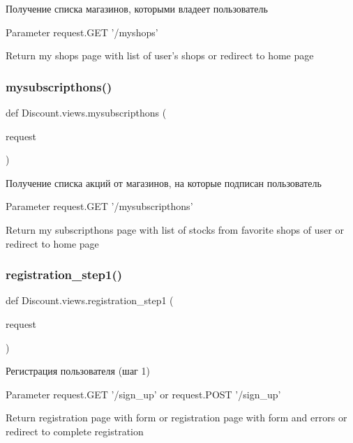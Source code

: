 \begin{DoxyVerb}Получение списка магазинов, которыми владеет пользователь

Parameter
    request.GET '/myshops'

Return
    my shops page with list of user's shops
    or
    redirect to home page
\end{DoxyVerb}
 \mbox{\label{namespace_discount_1_1views_abe8b7cafc25d6f2d730aa68ae948f586}} 
\subsubsection{\texorpdfstring{mysubscripthons()}{mysubscripthons()}}
{\footnotesize\ttfamily def Discount.\+views.\+mysubscripthons (\begin{DoxyParamCaption}\item[{}]{request }\end{DoxyParamCaption})}

\begin{DoxyVerb}Получение списка акций от магазинов, на которые подписан пользователь

Parameter
    request.GET '/mysubscripthons'

Return
    my subscripthons page with list of stocks from favorite shops of user
    or
    redirect to home page
\end{DoxyVerb}
 \mbox{\label{namespace_discount_1_1views_a6fe3e41a2a7d661f576ef987dddcb1e4}} 
\subsubsection{\texorpdfstring{registration\+\_\+step1()}{registration\_step1()}}
{\footnotesize\ttfamily def Discount.\+views.\+registration\+\_\+step1 (\begin{DoxyParamCaption}\item[{}]{request }\end{DoxyParamCaption})}

\begin{DoxyVerb}Регистрация пользователя (шаг 1)

Parameter
    request.GET '/sign_up' or request.POST '/sign_up'

Return
    registration page with form
    or
    registration page with form and errors
    or
    redirect to complete registration
\end{DoxyVerb}
 \mbox{\label{namespace_discount_1_1views_aa1fb55cf7351af98f96003a48105e5b3}} 
